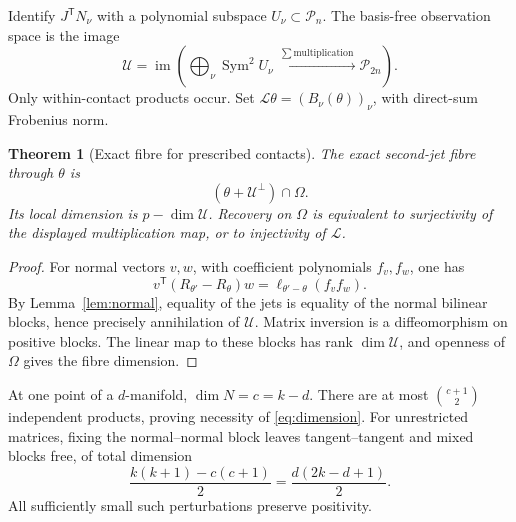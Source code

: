 \documentclass[11pt,reqno]{amsart}
\numberwithin{equation}{section}
\newtheorem{theorem}{Theorem}[section]
\theoremstyle{definition}\newtheorem{definition}[theorem]{Definition}
\theoremstyle{remark}\newtheorem{remark}[theorem]{Remark}
\newcommand{\PP}{\mathcal P}
\newcommand{\Sym}{\operatorname{Sym}}
\newcommand{\LL}{\mathcal L}
\begin{document}
Identify $J^{\mathsf T}N_\nu$ with a polynomial subspace $U_\nu\subset\PP_n$. The basis-free observation space is the image
\[
 \mathcal U=\operatorname{im}\left(
 \bigoplus_\nu\Sym^2U_\nu\xrightarrow{\ \sum\mathrm{multiplication}\ }\PP_{2n}\right).
\]
Only within-contact products occur. Set $\LL\theta=(B_\nu(\theta))_\nu$, with direct-sum Frobenius norm.
\begin{theorem}[Exact fibre for prescribed contacts]\label{thm:fibre}
The exact second-jet fibre through $\theta$ is
\[
 (\theta+\mathcal U^\perp)\cap\Omega.
\]
Its local dimension is $p-\dim\mathcal U$. Recovery on $\Omega$ is equivalent to surjectivity of the displayed multiplication map, or to injectivity of $\LL$.
\end{theorem}
\begin{proof}
For normal vectors $v,w$, with coefficient polynomials $f_v,f_w$, one has
\[
 v^{\mathsf T}(R_{\theta'}-R_\theta)w=\ell_{\theta'-\theta}(f_vf_w).
\]
By Lemma~\ref{lem:normal}, equality of the jets is equality of the normal bilinear blocks, hence precisely annihilation of $\mathcal U$. Matrix inversion is a diffeomorphism on positive blocks. The linear map to these blocks has rank $\dim\mathcal U$, and openness of $\Omega$ gives the fibre dimension.
\end{proof}
At one point of a $d$-manifold, $\dim N=c=k-d$. There are at most $\binom{c+1}{2}$ independent products, proving necessity of \eqref{eq:dimension}. For unrestricted matrices, fixing the normal--normal block leaves tangent--tangent and mixed blocks free, of total dimension
\begin{equation}\label{eq:ambient}
 \frac{k(k+1)-c(c+1)}2=\frac{d(2k-d+1)}2.
\end{equation}
All sufficiently small such perturbations preserve positivity.
\end{document}
